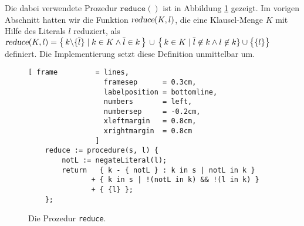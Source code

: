 Die dabei verwendete Prozedur $\texttt{reduce}()$ ist in Abbildung \ref{fig:reduce} gezeigt.
Im vorigen Abschnitt hatten wir die Funktion $\textsl{reduce}(K,l)$, die eine
Klausel-Menge $K$ mit Hilfe des Literals $l$ reduziert, als
\\[0.2cm]
\hspace*{1.3cm}
$\textsl{reduce}(K,l)  = 
 \bigl\{\, k \backslash \{\overline{l}\} \;|\; k \in K \wedge \overline{l} \in k \,\bigr\} 
       \,\cup\, \bigl\{\, k \in K \mid \overline{l} \not\in k \wedge l \not\in k \} \cup \bigl\{\{l\}\bigr\}
$
\\[0.2cm]
definiert.
Die Implementierung setzt diese Definition unmittelbar um.  


\begin{figure}[!ht]
  \centering
\begin{Verbatim}[ frame         = lines, 
                  framesep      = 0.3cm, 
                  labelposition = bottomline,
                  numbers       = left,
                  numbersep     = -0.2cm,
                  xleftmargin   = 0.8cm,
                  xrightmargin  = 0.8cm
                ]
    reduce := procedure(s, l) {
        notL := negateLiteral(l);
        return   { k - { notL } : k in s | notL in k } 
               + { k in s | !(notL in k) && !(l in k) } 
               + { {l} };
    };
\end{Verbatim}
\vspace*{-0.3cm}
  \caption{Die Prozedur \texttt{reduce}.}
  \label{fig:reduce}
\end{figure} 

